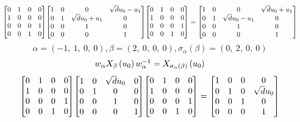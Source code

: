 \documentclass[11pt]{article}
\theoremstyle{definition}
\begin{document}
\[
\scaletoalign{\textwidth}{{\left[\begin{matrix}0 & 1 & 0 & 0\\1 & 0 & 0 & 0\\0 & 0 & 0 & 1\\0 & 0 & 1 & 0\end{matrix}\right]} {\left[\begin{matrix}1 & 0 & 0 & \sqrt{d} u_{0} - u_{1}\\0 & 1 & \sqrt{d} u_{0} + u_{1} & 0\\0 & 0 & 1 & 0\\0 & 0 & 0 & 1\end{matrix}\right]} {\left[\begin{matrix}0 & 1 & 0 & 0\\1 & 0 & 0 & 0\\0 & 0 & 0 & 1\\0 & 0 & 1 & 0\end{matrix}\right]} = {\left[\begin{matrix}1 & 0 & 0 & \sqrt{d} u_{0} + u_{1}\\0 & 1 & \sqrt{d} u_{0} - u_{1} & 0\\0 & 0 & 1 & 0\\0 & 0 & 0 & 1\end{matrix}\right]}}
\]
\[
\alpha = \left( -1, \  1, \  0, \  0\right), \beta = \left( 2, \  0, \  0, \  0\right), \sigma_{\alpha}(\beta) = \left( 0, \  2, \  0, \  0\right)
\]
\[
\scaletoalign{\textwidth}{w_{\alpha} X_{\beta}\left(u_{0}\right) w_{\alpha}^{-1} = X_{\sigma_{\alpha}\left(\beta\right)}\left(u_{0}\right)}
\]
\[
\scaletoalign{\textwidth}{{\left[\begin{matrix}0 & 1 & 0 & 0\\1 & 0 & 0 & 0\\0 & 0 & 0 & 1\\0 & 0 & 1 & 0\end{matrix}\right]} {\left[\begin{matrix}1 & 0 & \sqrt{d} u_{0} & 0\\0 & 1 & 0 & 0\\0 & 0 & 1 & 0\\0 & 0 & 0 & 1\end{matrix}\right]} {\left[\begin{matrix}0 & 1 & 0 & 0\\1 & 0 & 0 & 0\\0 & 0 & 0 & 1\\0 & 0 & 1 & 0\end{matrix}\right]} = {\left[\begin{matrix}1 & 0 & 0 & 0\\0 & 1 & 0 & \sqrt{d} u_{0}\\0 & 0 & 1 & 0\\0 & 0 & 0 & 1\end{matrix}\right]}}
\]
\end{document}

